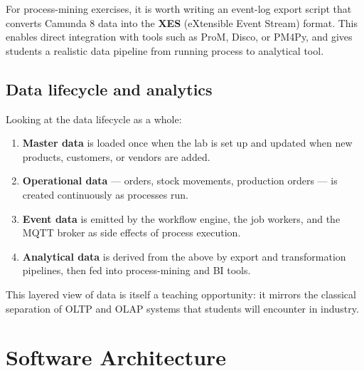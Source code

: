 \documentclass[
  english,
  11pt,
  a4paper,
]{scrbook}
\providecommand{\tightlist}{%
  \setlength{\itemsep}{0pt}\setlength{\parskip}{0pt}}
\begin{document}
\begin{tcolorbox}[enhanced jigsaw, arc=.35mm, bottomrule=.15mm, bottomtitle=1mm, breakable, colback=white, colbacktitle=quarto-callout-tip-color!10!white, colframe=quarto-callout-tip-color-frame, coltitle=black, left=2mm, leftrule=.75mm, opacityback=0, opacitybacktitle=0.6, rightrule=.15mm, title=\textcolor{quarto-callout-tip-color}{\faLightbulb}\hspace{0.5em}{Extension idea}, titlerule=0mm, toprule=.15mm, toptitle=1mm]

For process-mining exercises, it is worth writing an event-log export
script that converts Camunda 8 data into the \textbf{XES} (eXtensible
Event Stream) format. This enables direct integration with tools such as
ProM, Disco, or PM4Py, and gives students a realistic data pipeline from
running process to analytical tool.

\end{tcolorbox}

\section{Data lifecycle and
analytics}\label{data-lifecycle-and-analytics}

Looking at the data lifecycle as a whole:

\begin{enumerate}
\def\labelenumi{\arabic{enumi}.}
\tightlist
\item
  \textbf{Master data} is loaded once when the lab is set up and updated
  when new products, customers, or vendors are added.
\item
  \textbf{Operational data} --- orders, stock movements, production
  orders --- is created continuously as processes run.
\item
  \textbf{Event data} is emitted by the workflow engine, the job
  workers, and the MQTT broker as side effects of process execution.
\item
  \textbf{Analytical data} is derived from the above by export and
  transformation pipelines, then fed into process-mining and BI tools.
\end{enumerate}

This layered view of data is itself a teaching opportunity: it mirrors
the classical separation of OLTP and OLAP systems that students will
encounter in industry.


\chapter{Software Architecture}\label{software-architecture}
\end{document}
